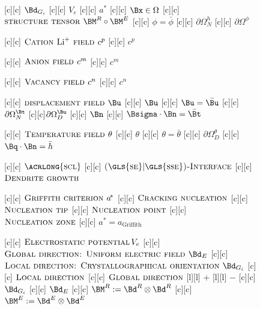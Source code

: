 \begin{figure}[htb!]
	\centering
	\footnotesize

	[c] {$\Bd_{G_{i}}$}
	[c] {$V_{e}$}
	[c]   {\scriptsize $a^{\!\ast}$}
	[c] {$\Bx \in \Omega$}
	[c] {$\textsc{structure tensor } \BM^{R} \circ \BM^{E}$}
	[c] {$\phi=\bar{\phi}$}
	[c] {$\partial\Omega^{h}_{N}$}
	[c] {$\partial\Omega^{\phi}$}

	[c]  {\scriptsize $\textsc{Cation } \text{Li}^{+}
			\textsc{ field }  c^{p}$}
	[c]  {$c^{p}$}

	[c] {\scriptsize $\textsc{Anion field } c^{m}$}
	[c]  {$c^{m}$}

	[c]   {\scriptsize $\textsc{Vacancy field } c^{n}$}
	[c]  {$c^{n}$}

	[c] {\scriptsize $\textsc{displacement field } \Bu$}
	[c]   {$\Bu$}
	[c] {$\Bu=\bar{\Bu}$}
	[c]  {$\partial\Omega^{\Bt}_{N}$}
	[c]{$\partial\Omega^{\Bu}_{D}$}
	[c]    {$\Bn$}
	[c] {$\Bsigma\cdot\Bn = \bar{\Bt}$}

	[c]  {\scriptsize $\textsc{Temperature field } \theta$}
	[c]    {$\theta$}
	[c] {$\theta = \bar{\theta}$}
	[c]  {$\partial\Omega^{\theta}_{D}$}
	[c]  {$\Bq\cdot\Bn = \bar{h}$}

	[c] {\scriptsize $\textsc{\acrlong{scl}}$}
	[c]  {\tiny $\textsc{(\gls{se}$|$\gls{sse})-Interface}$}
	[c] {\tiny $\textsc{Dendrite growth}$}

	[c] {\scriptsize $\textsc{Griffith criterion } a^{\!\ast}$}
	[c] {\tiny $\textsc{Cracking nucleation}$}
	[c] {\tiny $\textsc{Nucleation tip}$}
	[c] {\tiny $\textsc{Nucleation point}$}
	[c] {\tiny $\textsc{Nucleation zone}$}
	[c] {\tiny $a^{\!\ast}\!\!=\!a_{\text{Griffith}}$}

	[c] {\scriptsize $\textsc{Electrostatic potential}\, V_{e}$}
	[c]   {\tiny $\textsc{Global direction: Uniform electric field } \Bd_{E}$}
	[c]   {\tiny $\textsc{Local direction:  Crystallographical orientation } \Bd_{G_{i}}$}
	[c]   {\tiny $\textsc{Local direction}$}
	[c]   {\tiny $\textsc{Global direction}$}
	[l] {$+$}
	[l] {$-$}
	[c] {\tiny $\Bd_{G_{i}}$}
	[c] {\tiny $\Bd_{E}$}
	[c] {$\BM^{R} := \Bd^{R} \otimes \Bd^{R}$}
	[c] {$\BM^{E} := \Bd^{E} \otimes \Bd^{E}$}


\end{figure}

